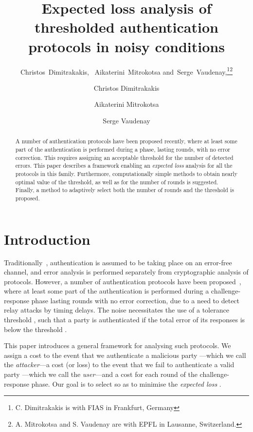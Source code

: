 \documentclass[a4paper]{article}
\title{Expected loss analysis of thresholded authentication protocols in noisy conditions}
\author{Christos~Dimitrakakis,~\IEEEmembership{Member,~IEEE,}
  Aikaterini~Mitrokotsa
  and~Serge~Vaudenay,\thanks{C. Dimitrakakis is with FIAS in Frankfurt, Germany}\thanks{A. Mitrokotsa and S. Vaudenay are with EPFL in Lausanne, Switzerland.}}
\author{Christos Dimitrakakis \and Aikaterini Mitrokotsa \and Serge Vaudenay}
\theoremstyle{plain} \newtheorem{remark}{Remark}
\theoremstyle{plain} \newtheorem{definition}{Definition}
\theoremstyle{plain} \newtheorem{example}{Example}
\theoremstyle{plain} \newtheorem{assumption}{Assumption}
\theoremstyle{plain} \newtheorem{conjecture}{Conjecture}
\theoremstyle{plain} \newtheorem{theorem}{Theorem}
\theoremstyle{plain} \newtheorem{proposition}{Proposition}
\theoremstyle{plain} \newtheorem{lemma}{Lemma}
\theoremstyle{plain} \newtheorem{corollary}{Corollary}
\begin{document}
\maketitle
\begin{abstract}
  A number of authentication protocols have been proposed recently,
  where at least some part of the authentication is performed during a
  phase, lasting  rounds, with no error correction. This requires
  assigning an acceptable threshold for the number of detected
  errors. This paper describes a framework enabling an
  \textit{expected loss} analysis for all the protocols in this
  family. Furthermore, computationally simple methods to obtain nearly
  optimal value of the threshold, as well as for the number of rounds
  is suggested. Finally, a method to adaptively select both the number
  of rounds and the threshold is proposed.
\end{abstract}


\section{Introduction}

Traditionally~\cite{stallings:cryptography,stinson:cryptography},
authentication is assumed to be taking place on an error-free channel,
and error analysis is performed separately from cryptographic analysis
of protocols.  However, a number of authentication protocols have been
proposed~\cite{brands94, bussard, singelee1,tippenhauer,
  sheddingLight,
  cryptoeprint:2009:310,hancke05,reid2007,KimAKSP-2008-icisc}, where
at least some part of the authentication is performed during a
challenge-response phase lasting  rounds with no error correction,
due to a need to detect relay attacks by timing delays.  The noise
necessitates the use of a tolerance threshold , such that a
party is authenticated if the total error of its responses 
is below the threshold .

This paper introduces a general framework for analysing such
protocols.  We assign a cost  to the event that we authenticate a
malicious party ---which we call the {\em attacker}---a cost (or
loss)  to the event that we fail to authenticate a valid party
---which we call the {\em user}---and a cost  for each round
of the challenge-response phase.  Our goal is to select  so
as to minimise the \textit{expected loss} .
\end{document}
